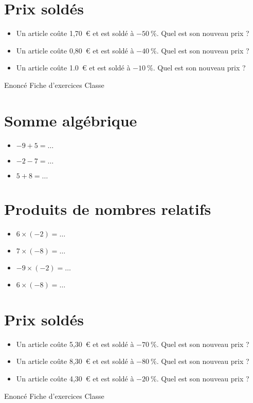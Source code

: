 \documentclass[a4paper,11pt,fleqn]{article}
\begin{document}
\section{Prix soldés}
\begin{itemize}

  \item Un article coûte 1,70~€ et est soldé à $-50~\%$. Quel est son nouveau prix ?
  \item Un article coûte 0,80~€ et est soldé à $-40~\%$. Quel est son nouveau prix ?
  \item Un article coûte 1.0~€ et est soldé à $-10~\%$. Quel est son nouveau prix ?
\end{itemize}
\newpage
\setcounter{exo}{0}
\setcounter{section}{0}
{Enoncé} \hfill {\huge Fiche d'exercices } \hfill {Classe}

\section{Somme algébrique}
\begin{itemize}

  \item $-9 +5=\ldots$
  \item $-2 -7=\ldots$
  \item $5 +8=\ldots$
\end{itemize}


\section{Produits de nombres relatifs}
\begin{itemize}

  \item $6\times(-2)=\ldots$
  \item $7\times(-8)=\ldots$
  \item $-9\times(-2)=\ldots$
  \item $6\times(-8)=\ldots$
\end{itemize}


\section{Prix soldés}
\begin{itemize}

  \item Un article coûte 5,30~€ et est soldé à $-70~\%$. Quel est son nouveau prix ?
  \item Un article coûte 8,30~€ et est soldé à $-80~\%$. Quel est son nouveau prix ?
  \item Un article coûte 4,30~€ et est soldé à $-20~\%$. Quel est son nouveau prix ?
\end{itemize}
\newpage
\setcounter{exo}{0}
\setcounter{section}{0}
{Enoncé} \hfill {\huge Fiche d'exercices } \hfill {Classe}
\end{document}
